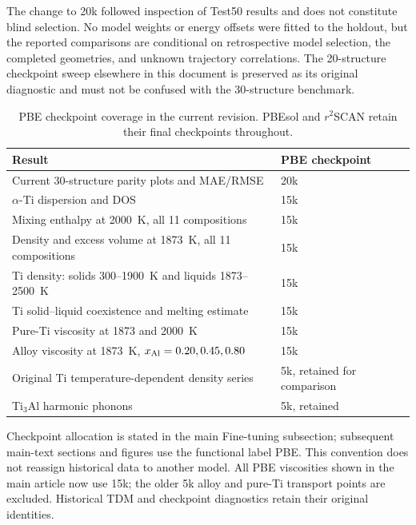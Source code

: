 \documentclass[10pt]{article}
\newcommand{\rscan}{\ensuremath{r^{2}}SCAN}
\begin{document}
The change to 20k followed inspection of Test50 results and does not constitute blind selection. No model weights or energy offsets were fitted to the holdout, but the reported comparisons are conditional on retrospective model selection, the completed geometries, and unknown trajectory correlations. The 20-structure checkpoint sweep elsewhere in this document is preserved as its original diagnostic and must not be confused with the 30-structure benchmark.

\begin{table}[htbp]
\centering
\caption{PBE checkpoint coverage in the current revision. PBEsol and \rscan{} retain their final checkpoints throughout.}
\label{tab:coverage}
\begin{tabular}{p{.68\linewidth}l}
\toprule
Result & PBE checkpoint\\
\midrule
Current 30-structure parity plots and MAE/RMSE & 20k\\
$\alpha$-Ti dispersion and DOS & 15k\\
Mixing enthalpy at 2000~K, all 11 compositions & 15k\\
Density and excess volume at 1873~K, all 11 compositions & 15k\\
Ti density: solids 300--1900~K and liquids 1873--2500~K & 15k\\
Ti solid--liquid coexistence and melting estimate & 15k\\
Pure-Ti viscosity at 1873 and 2000~K & 15k\\
Alloy viscosity at 1873~K, $x_{\rm Al}=0.20,0.45,0.80$ & 15k\\
Original Ti temperature-dependent density series & 5k, retained for comparison\\
Ti$_3$Al harmonic phonons & 5k, retained\\
\bottomrule
\end{tabular}
\end{table}

Checkpoint allocation is stated in the main Fine-tuning subsection; subsequent main-text sections and figures use the functional label PBE. This convention does not reassign historical data to another model. All PBE viscosities shown in the main article now use 15k; the older 5k alloy and pure-Ti transport points are excluded. Historical TDM and checkpoint diagnostics retain their original identities.
\end{document}
